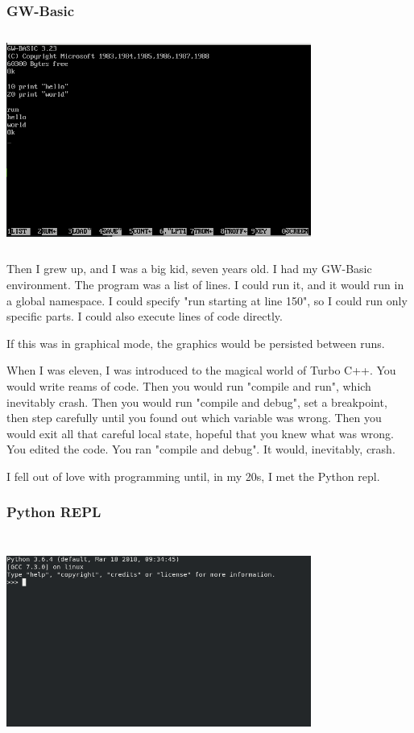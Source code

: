 \begin{frame}
\frametitle{GW-Basic}

\includegraphics[height=7cm,width=10cm]{gwbasic.png}

\end{frame}

Then I grew up,
and I was a big kid,
seven years old.
I had my GW-Basic environment.
The program was a list of lines.
I could run it,
and it would run in a global namespace.
I could specify
"run starting at line 150",
so I could run only specific parts.
I could also execute lines of code directly.

If this was in graphical mode,
the graphics would be persisted between runs.

When I was eleven,
I was introduced to the magical world of Turbo C++.
You would write reams of code.
Then you would run "compile and run",
which inevitably crash.
Then you would run "compile and debug",
set a breakpoint,
then step carefully until you found out which variable was wrong.
Then you would exit all that careful local state,
hopeful that you knew what was wrong.
You edited the code.
You ran "compile and debug".
It would,
inevitably, crash.

I fell out of love with programming until,
in my 20s,
I met the Python repl.

\begin{frame}
\frametitle{Python REPL}

\includegraphics[height=7cm,width=10cm]{python-repl.png}

\end{frame}

